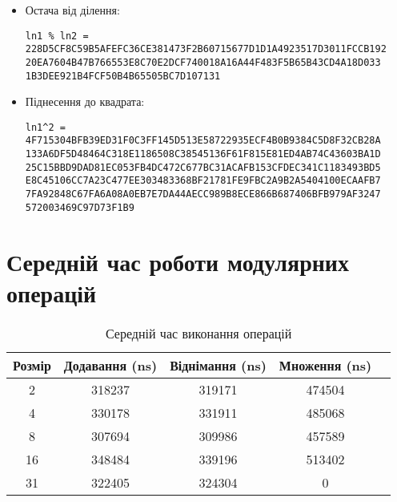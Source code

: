 \documentclass{article}
\begin{document}
\begin{itemize}
\item Остача від ділення:
\begin{verbatim}
ln1 % ln2 = 228D5CF8C59B5AFEFC36CE381473F2B60715677D1D1A4923517D3011FCCB192
20EA7604B47B766553E8C70E2DCF740018A16A44F483F5B65B43CD4A18D033
1B3DEE921B4FCF50B4B65505BC7D107131
\end{verbatim}

\item Піднесення до квадрата:
\begin{verbatim}
ln1^2 = 4F715304BFB39ED31F0C3FF145D513E58722935ECF4B0B9384C5D8F32CB28A
133A6DF5D48464C318E1186508C38545136F61F815E81ED4AB74C43603BA1D
25C15BBD9DAD81EC053FB4DC472C677BC31ACAFB153CFDEC341C1183493BD5
E8C45106CC7A23C477EE303483368BF21781FE9FBC2A9B2A5404100ECAAFB7
7FA92848C67FA6A08A0EB7E7DA44AECC989B8ECE866B687406BFB979AF3247
572003469C97D73F1B9
\end{verbatim}
\end{itemize}

\section{Середній час роботи модулярних операцій}
\begin{table}[h]
\centering
\begin{tabular}{|c|c|c|c|c|}
\hline
\textbf{Розмір} & \textbf{Додавання (ns)} & \textbf{Віднімання (ns)} & \textbf{Множення (ns)} \\
\hline
2 & 318237 & 319171 & 474504 \\
4 & 330178 & 331911 & 485068 \\
8 & 307694 & 309986 & 457589 \\
16 & 348484 & 339196 & 513402\\
31 & 322405 & 324304 & 0 \\
\hline
\end{tabular}
\caption{Середній час виконання операцій}
\label{tab:comparison}
\end{table}


\end{document}
